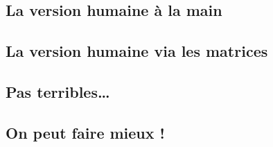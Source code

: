 \subsection{La version \og humaine \fg{} à la main} 






\subsection{La version \og humaine \fg{} via les matrices} 







\subsection{Pas terribles\dots{}} 







\subsection{On peut faire mieux !} 




